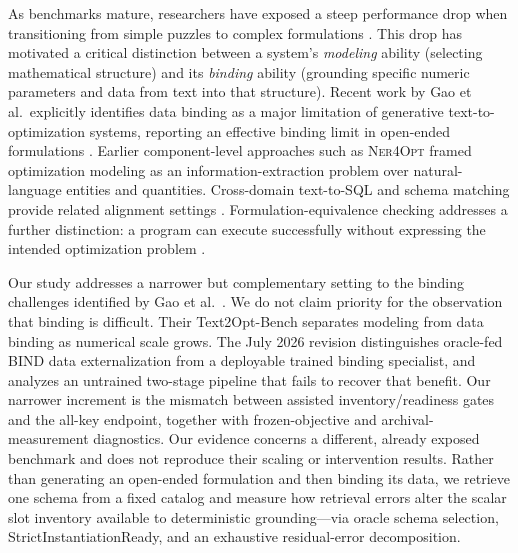 \documentclass[pdflatex,sn-basic,Numbered]{sn-jnl}
\begin{document}
As benchmarks mature, researchers have exposed a steep performance drop when transitioning from simple puzzles to complex formulations \cite{miplibnl2026}. This drop has motivated a critical distinction between a system's \emph{modeling} ability (selecting mathematical structure) and its \emph{binding} ability (grounding specific numeric parameters and data from text into that structure). Recent work by Gao et al.\ explicitly identifies data binding as a major limitation of generative text-to-optimization systems, reporting an effective binding limit in open-ended formulations \cite{gao2026models}. Earlier component-level approaches such as \textsc{Ner4Opt} \cite{kadioglu2024ner4opt} framed optimization modeling as an information-extraction problem over natural-language entities and quantities. Cross-domain text-to-SQL and schema matching provide related alignment settings \cite{yu2018spider,affolter2019nli,sheetrit2024rematch}. Formulation-equivalence checking addresses a further distinction: a program can execute successfully without expressing the intended optimization problem \cite{zhai2025equivamap}.

Our study addresses a narrower but complementary setting to the binding challenges identified by Gao et al.\ \cite{gao2026models}. We do not claim priority for the observation that binding is difficult. Their Text2Opt-Bench separates modeling from data binding as numerical scale grows. The July 2026 revision distinguishes oracle-fed BIND data externalization from a deployable trained binding specialist, and analyzes an untrained two-stage pipeline that fails to recover that benefit. Our narrower increment is the mismatch between assisted inventory/readiness gates and the all-key endpoint, together with frozen-objective and archival-measurement diagnostics. Our evidence concerns a different, already exposed benchmark and does not reproduce their scaling or intervention results. Rather than generating an open-ended formulation and then binding its data, we retrieve one schema from a fixed catalog and measure how retrieval errors alter the scalar slot inventory available to deterministic grounding---via oracle schema selection, StrictInstantiationReady, and an exhaustive residual-error decomposition.
\end{document}
